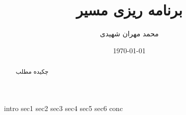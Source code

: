 \documentclass{article}
\title{برنامه ریزی مسیر}
\author{ محمد مهران شهیدی}
\date{\today}
\begin{document}
\maketitle
{}
\begin{abstract}
چکیده مطلب
\end{abstract}
\indent\indent
\newpage
\tableofcontents
\newpage
{}
{intro}
{sec1}
{sec2}
{sec3}
{sec4}
{sec5}
{sec6}
{conc}
\end{document}

